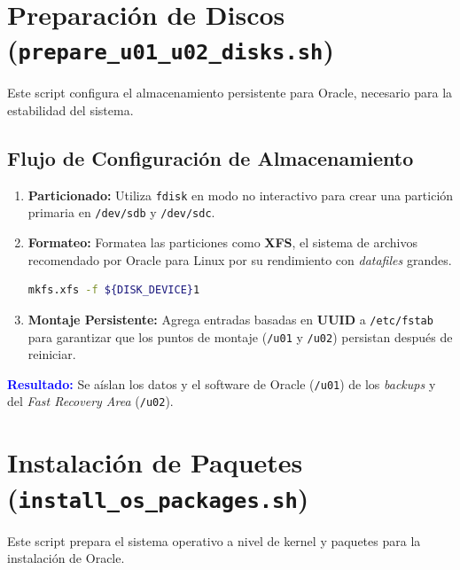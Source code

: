 \documentclass[11pt, a4paper]{report}
\newcommand{\destacado}[1]{\textbf{\textcolor{blue}{#1}}}
\begin{document}
\section{Preparación de Discos (\texttt{prepare\_u01\_u02\_disks.sh})}

Este script configura el almacenamiento persistente para Oracle, necesario para la estabilidad del sistema.
\subsection{Flujo de Configuración de Almacenamiento}
\begin{enumerate}
    \item \textbf{Particionado:} Utiliza \texttt{fdisk} en modo no interactivo para crear una partición primaria en \texttt{/dev/sdb} y \texttt{/dev/sdc}.
\item \textbf{Formateo:} Formatea las particiones como \textbf{XFS}, el sistema de archivos recomendado por Oracle para Linux por su rendimiento con \textit{datafiles} grandes.
\begin{lstlisting}[language=bash, caption={Comando de Formateo XFS}]
mkfs.xfs -f ${DISK_DEVICE}1
        \end{lstlisting}
    \item \textbf{Montaje Persistente:} Agrega entradas basadas en \textbf{UUID} a \texttt{/etc/fstab} para garantizar que los puntos de montaje (\texttt{/u01} y \texttt{/u02}) persistan después de reiniciar.
\end{enumerate}
\destacado{Resultado:} Se aíslan los datos y el software de Oracle (\texttt{/u01}) de los \textit{backups} y del \textit{Fast Recovery Area} (\texttt{/u02}).
\section{Instalación de Paquetes (\texttt{install\_os\_packages.sh})}

Este script prepara el sistema operativo a nivel de kernel y paquetes para la instalación de Oracle.
\end{document}
